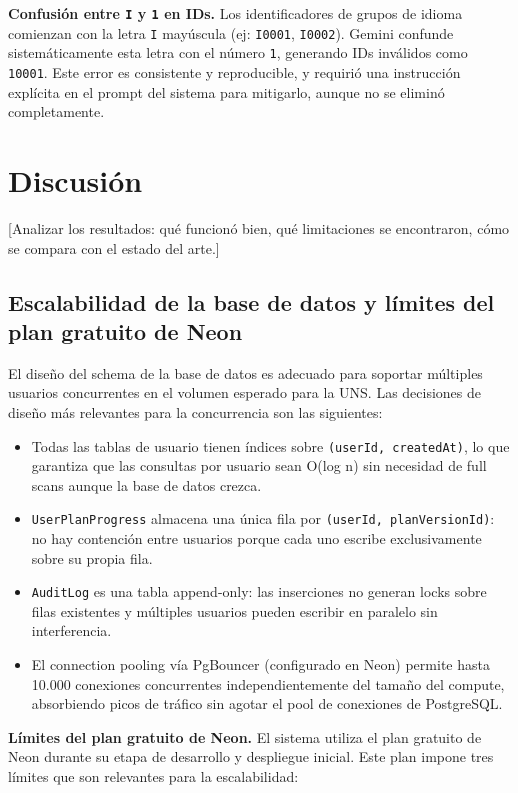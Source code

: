 \documentclass[12pt, a4paper]{report}
\begin{document}
\textbf{Confusión entre \texttt{I} y \texttt{1} en IDs.} Los identificadores de grupos de
idioma comienzan con la letra \texttt{I} mayúscula (ej: \texttt{I0001}, \texttt{I0002}).
Gemini confunde sistemáticamente esta letra con el número \texttt{1}, generando IDs
inválidos como \texttt{10001}. Este error es consistente y reproducible, y requirió una
instrucción explícita en el prompt del sistema para mitigarlo, aunque no se eliminó
completamente.

\section{Discusión}

[Analizar los resultados: qué funcionó bien, qué limitaciones se encontraron, cómo se
compara con el estado del arte.]

\subsection{Escalabilidad de la base de datos y límites del plan gratuito de Neon}

El diseño del schema de la base de datos es adecuado para soportar múltiples usuarios
concurrentes en el volumen esperado para la UNS. Las decisiones de diseño más relevantes
para la concurrencia son las siguientes:

\begin{itemize}
  \item Todas las tablas de usuario tienen índices sobre \texttt{(userId, createdAt)},
        lo que garantiza que las consultas por usuario sean O(log n) sin necesidad de
        full scans aunque la base de datos crezca.
  \item \texttt{UserPlanProgress} almacena una única fila por \texttt{(userId,
        planVersionId)}: no hay contención entre usuarios porque cada uno escribe
        exclusivamente sobre su propia fila.
  \item \texttt{AuditLog} es una tabla append-only: las inserciones no generan locks
        sobre filas existentes y múltiples usuarios pueden escribir en paralelo sin
        interferencia.
  \item El connection pooling vía PgBouncer (configurado en Neon) permite hasta 10.000
        conexiones concurrentes independientemente del tamaño del compute, absorbiendo
        picos de tráfico sin agotar el pool de conexiones de PostgreSQL.
\end{itemize}

\textbf{Límites del plan gratuito de Neon.} El sistema utiliza el plan gratuito de Neon
durante su etapa de desarrollo y despliegue inicial. Este plan impone tres límites que
son relevantes para la escalabilidad:
\end{document}
